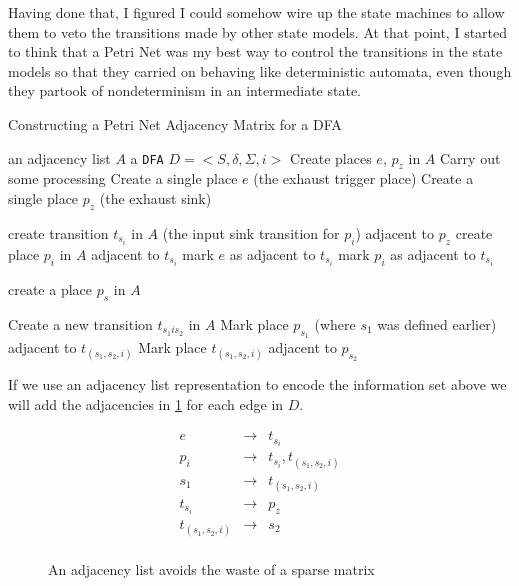 \documentclass[a4paper]{article}
\begin{document}
Having done that, I figured I could somehow wire up the state machines to allow
them to veto the transitions made by other state models. At that point, I
started to think that a Petri Net was my best way to control the transitions in
the state models so that they carried on behaving like deterministic automata,
even though they partook of nondeterminism in an intermediate state.

\begin{algorithm}
\caption{Constructing a Petri Net Adjacency Matrix for a DFA}
\label{alg1}
	
\begin{algorithmic}
	\REQUIRE an adjacency list $A$
	\REQUIRE a \verb|DFA| $D = <S, \delta, \Sigma, i>$
	\STATE Create places $e$, $p_z$ in $A$
	\STATE Carry out some processing
	\STATE Create a single place $e$ (the exhaust trigger place)
	\STATE Create a single place $p_z$ (the exhaust sink)

		\STATE create transition $t_{s_i}$ in $A$ (the input sink transition for $p_i$) adjacent to $p_z$
		\STATE create place $p_i$ in $A$ adjacent to $t_{s_i}$
		\STATE mark $e$ as adjacent to $t_{s_i}$ 
		\STATE mark $p_i$ as adjacent to $t_{s_i}$ 
	\ENDFOR

		\STATE create a place $p_s$ in $A$
	\ENDFOR

		\STATE Create a new transition $t_{s_1 i s_2}$ in $A$
		\STATE Mark place $p_{s_1}$ (where $s_1$ was defined earlier) adjacent to  $t_{(s_1, s_2, i)}$
		\STATE Mark place  $t_{(s_1, s_2, i)}$ adjacent to  $p_{s_2}$
	\ENDFOR
\end{algorithmic}
\end{algorithm}

If we use an adjacency list representation to encode the information set above
we will add the adjacencies in \ref{fig:adjList1} for each edge in $D$.

\begin{figure}[ht]
	\begin{center}
		\begin{displaymath}
		\begin{array}{lll}
			e & \to  & t_{s_i} \\
			p_i & \to  & t_{s_i}, t_{(s_1, s_2, i)} \\
			s_1 & \to  & t_{(s_1, s_2, i)} \\
			t_{s_i} &\to & p_z \\
			t_{(s_1, s_2, i)} & \to  & s_2 \\
		\end{array}
		\end{displaymath}
	\end{center}
	\caption{An adjacency list avoids the waste of a sparse matrix}
	\label{fig:adjList1}
\end{figure}
\end{document}
